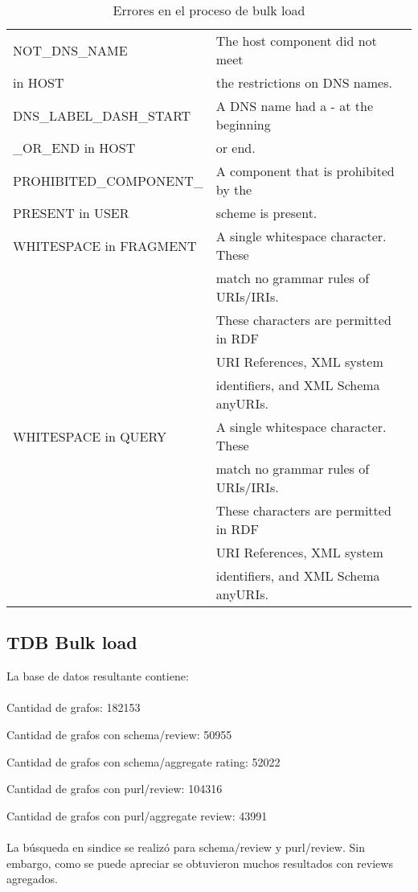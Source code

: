 \begin{table}[h]
\begin{tabular}{| l | l | }
NOT\_DNS\_NAME& The host component did not meet \\  in HOST  & the restrictions on DNS names.\\\hline
DNS\_LABEL\_DASH\_START& A DNS name had a - at the beginning \\ \_OR\_END in HOST  & or end.\\\hline
PROHIBITED\_COMPONENT\_& A component that is prohibited by the \\ PRESENT in USER  & scheme is present.\\\hline
WHITESPACE in FRAGMENT & A single whitespace character. These \\ & match no grammar  rules of URIs/IRIs. \\ & These characters are permitted in RDF \\ & URI References, XML system \\ & identifiers, and XML Schema anyURIs.\\\hline
WHITESPACE in QUERY &A single whitespace character. These \\ & match no grammar  rules of URIs/IRIs. \\ & These characters are permitted in RDF \\ & URI References, XML system \\ & identifiers, and XML Schema anyURIs.\\\hline
\end{tabular}
\caption{Errores en el proceso de bulk load}
\label{table:BulkLoadErrors}
\end{table}

\subsection{TDB Bulk load}

La base de datos resultante contiene:
\\\\
Cantidad de grafos: 182153

\noindent Cantidad de grafos con schema/review: 50955 

\noindent Cantidad de grafos con schema/aggregate rating: 52022

\noindent Cantidad de grafos con purl/review: 104316 

\noindent Cantidad de grafos con purl/aggregate review: 43991
\\\\
La búsqueda en sindice se realizó para schema/review y purl/review. Sin embargo, como se puede apreciar se obtuvieron muchos resultados con reviews agregados.
